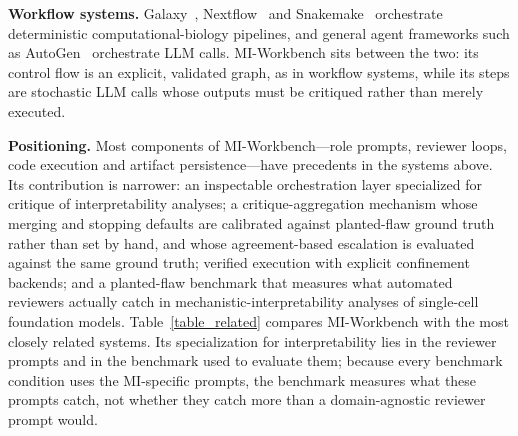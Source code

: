 \documentclass[10pt,letterpaper]{article}
\begin{document}
\noindent\textbf{Workflow systems.} Galaxy~\cite{afgan2018galaxy}, Nextflow~\cite{ditommaso2017nextflow} and Snakemake~\cite{molder2021sustainable} orchestrate deterministic computational-biology pipelines, and general agent frameworks such as AutoGen~\cite{wu2023autogen} orchestrate LLM calls. MI-Workbench sits between the two: its control flow is an explicit, validated graph, as in workflow systems, while its steps are stochastic LLM calls whose outputs must be critiqued rather than merely executed.

\noindent\textbf{Positioning.} Most components of MI-Workbench---role prompts, reviewer loops, code execution and artifact persistence---have precedents in the systems above. Its contribution is narrower: an inspectable orchestration layer specialized for critique of interpretability analyses; a critique-aggregation mechanism whose merging and stopping defaults are calibrated against planted-flaw ground truth rather than set by hand, and whose agreement-based escalation is evaluated against the same ground truth; verified execution with explicit confinement backends; and a planted-flaw benchmark that measures what automated reviewers actually catch in mechanistic-interpretability analyses of single-cell foundation models. Table~\ref{table_related} compares MI-Workbench with the most closely related systems. Its specialization for interpretability lies in the reviewer prompts and in the benchmark used to evaluate them; because every benchmark condition uses the MI-specific prompts, the benchmark measures what these prompts catch, not whether they catch more than a domain-agnostic reviewer prompt would.
\end{document}
